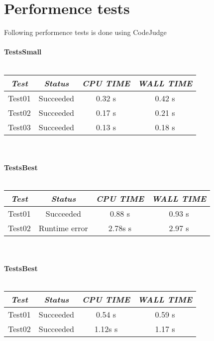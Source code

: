 \documentclass[a4paper,11pt]{article}
\begin{document}
\section*{Performence tests}
Following performence tests is done using CodeJudge\\
\hspace{5mm}\\

\textbf{TestsSmall}\\
\hspace{5mm}\\
\begin{adjustbox}{width=1\textwidth}
\tiny
\begin{tabular}{cccc}
\hline
\textit{Test} & \textit{Status} & \textit{CPU TIME} & \textit{WALL TIME} \\
\hline
Test01 & Succeeded & 0.32 s & 0.42 s \\
Test02 & Succeeded & 0.17 s & 0.21 s \\
Test03 & Succeeded & 0.13 s & 0.18 s \\
\hline
\end{tabular}
\end{adjustbox}

\hspace{5mm}\\
\hspace{5mm}\\

\textbf{TestsBest}\\
\hspace{5mm}\\
\begin{adjustbox}{width=1\textwidth}
\tiny
\begin{tabular}{cccc}
\hline
\textit{Test} & \textit{Status} & \textit{CPU TIME} & \textit{WALL TIME} \\
\hline
Test01 & Succeeded & 0.88 s & 0.93 s \\
Test02 & Runtime error & 2.78s s & 2.97 s \\
\hline
\end{tabular}
\end{adjustbox}

\hspace{5mm}\\
\hspace{5mm}\\

\textbf{TestsBest}\\
\hspace{5mm}\\
\begin{adjustbox}{width=1\textwidth}
\tiny
\begin{tabular}{cccc}
\hline
\textit{Test} & \textit{Status} & \textit{CPU TIME} & \textit{WALL TIME} \\
\hline
Test01 & Succeeded & 0.54 s & 0.59 s \\
Test02 & Succeeded & 1.12s s & 1.17 s \\
\hline
\end{tabular}
\end{adjustbox}
\end{document}
